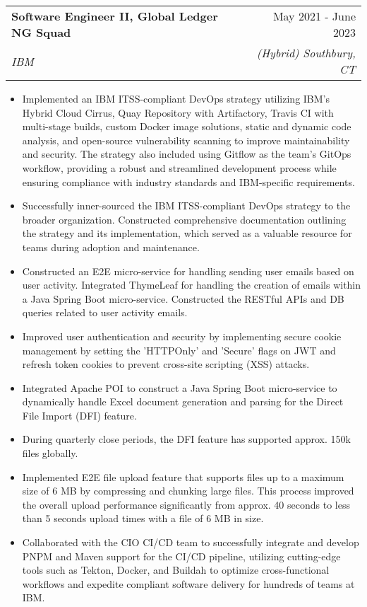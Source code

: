 \documentclass[letterpaper,11pt]{article}
\makeatletter
\newcommand{\resumeItem}[1]{
  \item[-] \small{
    {#1 \vspace{-2pt}}
  }
}
\newcommand{\resumeSubheading}[4]{
  \vspace{-2pt}\item
    \begin{tabular*}{0.97\textwidth}[t]{l@{\extracolsep{\fill}}r}
      \textbf{#1} & #2 \\
      \textit{\small#3} & \textit{\small #4} \\
    \end{tabular*}\vspace{-7pt}
}
\newcommand{\resumeItemListStart}{\begin{itemize}[rightmargin=\dimexpr\linewidth-17.25cm-\leftmargin\relax]}
\newcommand{\resumeItemListEnd}{\end{itemize}\vspace{-5pt}}
\makeatother
\begin{document}
\resumeSubheading
{Software Engineer II, Global Ledger NG Squad}{May 2021 - June 2023}
{IBM}{(Hybrid) Southbury, CT}
\resumeItemListStart
\resumeItem{Implemented an IBM ITSS-compliant DevOps strategy utilizing IBM's Hybrid Cloud Cirrus, Quay Repository with Artifactory, Travis CI with multi-stage builds, custom Docker image solutions, static and dynamic code analysis, and open-source vulnerability scanning to improve maintainability and security. The strategy also included using Gitflow as the team's GitOps workflow, providing a robust and streamlined development process while ensuring compliance with industry standards and IBM-specific requirements.}
\resumeItem{Successfully inner-sourced the IBM ITSS-compliant DevOps strategy to the broader organization. Constructed comprehensive documentation outlining the strategy and its implementation, which served as a valuable resource for teams during adoption and maintenance.}
\resumeItem{Constructed an E2E micro-service for handling sending user emails based on user activity. Integrated ThymeLeaf for handling the creation of emails within a Java Spring Boot micro-service. Constructed the RESTful APIs and DB queries related to user activity emails.}
\resumeItem{Improved user authentication and security by implementing secure cookie management by setting the 'HTTPOnly' and 'Secure' flags on JWT and refresh token cookies to prevent cross-site scripting (XSS) attacks.}
\resumeItem{Integrated Apache POI to construct a Java Spring Boot micro-service to dynamically handle Excel document generation and parsing for the Direct File Import (DFI) feature.}
\resumeItem{During quarterly close periods, the DFI feature has supported approx. 150k files globally.}
\resumeItem{Implemented E2E file upload feature that supports files up to a maximum size of 6 MB by compressing and chunking large files. This process improved the overall upload performance significantly from approx. 40 seconds to less than 5 seconds upload times with a file of 6 MB in size.}
\resumeItem{Collaborated with the CIO CI/CD team to successfully integrate and develop PNPM and Maven support for the CI/CD pipeline, utilizing cutting-edge tools such as Tekton, Docker, and Buildah to optimize cross-functional workflows and expedite compliant software delivery for hundreds of teams at IBM.}
\resumeItemListEnd
\end{document}
